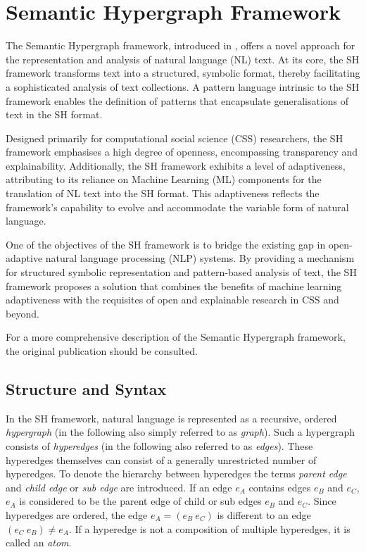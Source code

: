\documentclass[11pt]{scrreprt}
\let\citef\cite  %
\let\cite\parencite  %
\begin{document}
\section{Semantic Hypergraph Framework}

The Semantic Hypergraph framework, introduced in \citef{menezesSemanticHypergraphs2021}, offers a novel approach for the representation and analysis of natural language (NL) text. At its core, the SH framework transforms text into a structured, symbolic format, thereby facilitating a sophisticated analysis of text collections. A pattern language intrinsic to the SH framework enables the definition of patterns that encapsulate generalisations of text in the SH format.

Designed primarily for computational social science (CSS) researchers, the SH framework emphasises a high degree of openness, encompassing transparency and explainability. Additionally, the SH framework exhibits a level of adaptiveness, attributing to its reliance on Machine Learning (ML) components for the translation of NL text into the SH format. This adaptiveness reflects the framework's capability to evolve and accommodate the variable form of natural language.

One of the objectives of the SH framework is to bridge the existing gap in open-adaptive natural language processing (NLP) systems. By providing a mechanism for structured symbolic representation and pattern-based analysis of text, the SH framework proposes a solution that combines the benefits of machine learning adaptiveness with the requisites of open and explainable research in CSS and beyond.

For a more comprehensive description of the Semantic Hypergraph framework, the original publication \cite{menezesSemanticHypergraphs2021} should be consulted.


\subsection{Structure and Syntax}
In the SH framework, natural language is represented as a recursive, ordered \textit{hypergraph} (in the following also simply referred to as \textit{graph}). Such a hypergraph consists of \textit{hyperedges} (in the following also referred to as \textit{edges}). These hyperedges themselves can consist of a generally unrestricted number of hyperedges. To denote the hierarchy between hyperedges the terms \textit{parent edge} and \textit{child edge} or \textit{sub edge} are introduced. If an edge \(e_A\) contains edges \(e_B\) and \(e_C\), \(e_A\) is considered to be the parent edge of child or sub edges \(e_B\) and \(e_C\). Since hyperedges are ordered, the edge \(e_A = (e_B \ e_C)\) is different to an edge \((e_C \  e_B) \neq e_A\). If a hyperedge is not a composition of multiple hyperedges, it is called an \textit{atom}.
\end{document}
